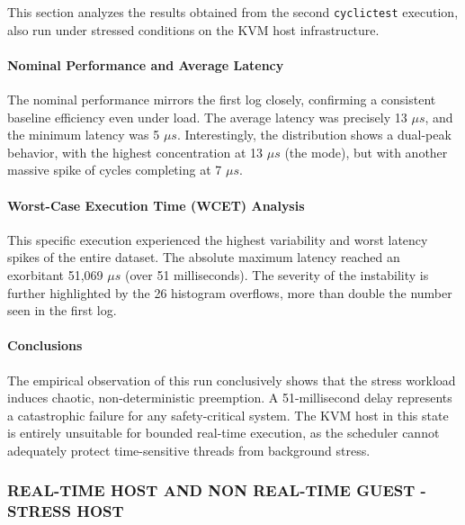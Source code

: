 This section analyzes the results obtained from the second
\texttt{cyclictest} execution, also run under stressed conditions on the
KVM host infrastructure.

\paragraph{Nominal Performance and Average
Latency}\label{nominal-performance-and-average-latency-3}

The nominal performance mirrors the first log closely, confirming a
consistent baseline efficiency even under load. The average latency was
precisely 13 $\mu s$, and the minimum latency was 5 $\mu s$. Interestingly, the
distribution shows a dual-peak behavior, with the highest concentration
at 13 $\mu s$ (the mode), but with another massive spike of cycles completing
at 7 $\mu s$.

\paragraph{Worst-Case Execution Time (WCET)
Analysis}\label{worst-case-execution-time-wcet-analysis-3}

This specific execution experienced the highest variability and worst
latency spikes of the entire dataset. The absolute maximum latency
reached an exorbitant 51,069 $\mu s$ (over 51 milliseconds). The severity of
the instability is further highlighted by the 26 histogram overflows,
more than double the number seen in the first log.

\paragraph{Conclusions}\label{conclusions-1}

The empirical observation of this run conclusively shows that the stress
workload induces chaotic, non-deterministic preemption. A 51-millisecond
delay represents a catastrophic failure for any safety-critical system.
The KVM host in this state is entirely unsuitable for bounded real-time
execution, as the scheduler cannot adequately protect time-sensitive
threads from background stress.

\subsubsection{REAL-TIME HOST AND NON REAL-TIME GUEST -STRESS
HOST}\label{real-time-host-and-non-real-time-guest--stress-host}

